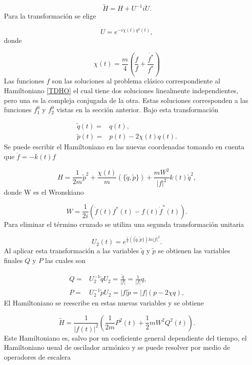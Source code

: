 \documentclass[10pt,a4paper]{report}
\begin{document}
\begin{equation}
\tilde{H} = H + U^{-1}i\dot{U}.
\end{equation} Para la transformación se elige

\begin{equation}
U = e^{-i\chi(t)q^2(t)},
\end{equation} donde

\begin{equation}
\chi(t) = \frac{m}{4}(\frac{\dot{f}}{f}+\frac{\dot{f^*}}{f^*})
\end{equation} Las funciones $f$ son las soluciones al problema clásico correspondiente al Hamiltoniano \eqref{TDHO} el cual tiene dos soluciones linealmente independientes, pero una es la compleja conjugada de la otra. Estas soluciones corresponden a las funciones $f_1^0$  y $f_2^0$ vistas en la sección anterior. Bajo esta transformación

\begin{align}
\tilde{q}(t)=&q(t),\\
\tilde{p}(t)=&p(t)-2\chi(t)q(t).
\end{align} Se puede escribir el Hamiltoniano en las nuevas coordenadas tomando en cuenta que $\ddot{f}= -k(t)f$

\begin{equation}
 H = \frac{1}{2m}\tilde{p}^2 + \frac{\chi(t)}{m}(\{\tilde{q},\tilde{p}\}) + \frac{mW^2}{|f|^2}k(t)\tilde{q}^2,
\end{equation} donde W es el Wronskiano

\begin{equation}
W=\frac{1}{2i}(\dot{f}(t)f^*(t)-f(t)\dot{f}^*(t)).
\end{equation} Para eliminar el término cruzado se utiliza una segunda transformación unitaria

\begin{equation}
U_2(t)=e^{\frac{i}{4}(\{\tilde{q},\tilde{p}\})ln|f|^2}.
\end{equation} Al aplicar esta transformación a las variables $\tilde{q}$ y $\tilde{p}$ se obtienen las variables finales $Q$ y $P$ las cuales son

\begin{align}
Q=&U_2^{-1}\tilde{q}U_2 = \frac{\tilde{q}}{|f|} =\frac{1}{|f|}q,\\
P=&U_2^{-1}\tilde{p}U_2 = |f|\tilde{p} =|f|(p-2\chi q), 
\end{align} El Hamiltoniano se reescribe en estas nuevas variables y se obtiene

\begin{equation}\label{QTDHO}
\tilde{H} = \frac{1}{|f(t)|^2}(\frac{1}{2m}P^2(t)+\frac{1}{2}mW^2Q^2(t)).
\end{equation}Este Hamiltoniano es, salvo por un coeficiente general dependiente del tiempo, el Hamiltoniano usual de oscilador armónico y se puede resolver por medio de operadores de escalera
\end{document}
